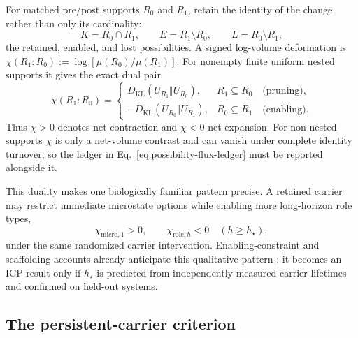 For matched pre/post supports $R_0$ and $R_1$, retain the identity of the
change rather than only its cardinality:
\begin{equation}
 K=R_0\cap R_1,\qquad E=R_1\setminus R_0,\qquad L=R_0\setminus R_1,
 \label{eq:possibility-flux-ledger}
\end{equation}
the retained, enabled, and lost possibilities. A signed log-volume deformation
is $\chi(R_1:R_0):=\log[\mu(R_0)/\mu(R_1)]$. For nonempty finite uniform nested
supports it gives the exact dual pair
\begin{equation}
 \chi(R_1:R_0)=
 \begin{cases}
 D_{\mathrm{KL}}(U_{R_1}\Vert U_{R_0}),&R_1\subseteq R_0
 \quad\text{(pruning)},\\[3pt]
 -D_{\mathrm{KL}}(U_{R_0}\Vert U_{R_1}),&R_0\subseteq R_1
 \quad\text{(enabling)}.
 \end{cases}
 \label{eq:signed-kl-duality}
\end{equation}
Thus $\chi>0$ denotes net contraction and $\chi<0$ net expansion. For
non-nested supports $\chi$ is only a net-volume contrast and can vanish under
complete identity turnover, so the ledger in
Eq.~\eqref{eq:possibility-flux-ledger} must be reported alongside it.

This duality makes one biologically familiar pattern precise. A retained
carrier may restrict immediate microstate options while enabling more
long-horizon role types,
\begin{equation}
 \chi_{\mathrm{micro},1}>0,\qquad
 \chi_{\mathrm{role},h}<0\quad(h\ge h_\star),
 \label{eq:constraint-enablement-crossover}
\end{equation}
under the same randomized carrier intervention. Enabling-constraint and
scaffolding accounts already anticipate this qualitative pattern
\citep{Kauffman2014Prolegomenon,Griesemer2024Scaffolded}; it becomes an ICP
result only if $h_\star$ is predicted from independently measured carrier
lifetimes and confirmed on held-out systems.

\subsection{The persistent-carrier criterion}
\label{sec:criterion}

